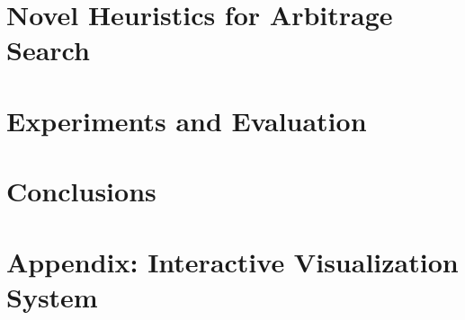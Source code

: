 \documentclass[10pt,twocolumn,letterpaper]{article}
\begin{document}
\section{Novel Heuristics for Arbitrage Search}


\section{Experiments and Evaluation}







\section{Conclusions}





\appendix
\section{Appendix: Interactive Visualization System}

\end{document}
